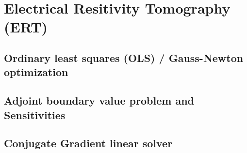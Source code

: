 \section{Electrical Resitivity Tomography (ERT)}\label{sect:crtomo_ert}
\subsection{Ordinary least squares (OLS) / Gauss-Newton optimization}\label{sect:crtomo_ert}
\subsection{Adjoint boundary value problem and Sensitivities}\label{sub:crtomo_adj}
\subsection{Conjugate Gradient linear solver}\label{sect:crtomo_ert}

